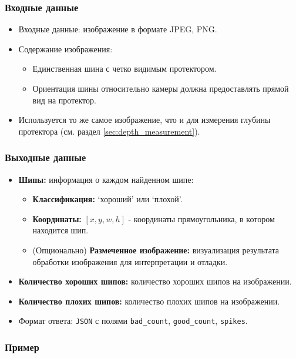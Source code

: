 \documentclass[12pt]{article}
\begin{document}
\subsubsection{Входные данные}
\begin{itemize}
	\item Входные данные: изображение в формате JPEG, PNG.
	\item Содержание изображения:
	      \begin{itemize}
		      \item Единственная шина с четко видимым протектором.
		      \item Ориентация шины относительно камеры должна предоставлять прямой вид на протектор.
	      \end{itemize}
	\item Используется то же самое изображение, что и для измерения глубины протектора (см. раздел \ref{sec:depth_measurement}).
\end{itemize}

\subsubsection{Выходные данные}
\begin{itemize}
	\item \textbf{Шипы:} информация о каждом найденном шипе:
	      \begin{itemize}
		      \item \textbf{Классификация:} `хороший' или `плохой'.
		      \item \textbf{Координаты:} $[x, y, w, h]$ - координаты прямоугольника, в котором находится шип.
		      \item (Опционально) \textbf{Размеченное изображение:} визуализация результата обработки изображения для интерпретации и отладки.
	      \end{itemize}
	\item \textbf{Количество хороших шипов:} количество хороших шипов на изображении.
	\item \textbf{Количество плохих шипов:} количество плохих шипов на изображении.
	\item Формат ответа: \texttt{JSON} с полями \texttt{bad\_count}, \texttt{good\_count}, \texttt{spikes}.
\end{itemize}

\subsubsection{Пример}
\end{document}
